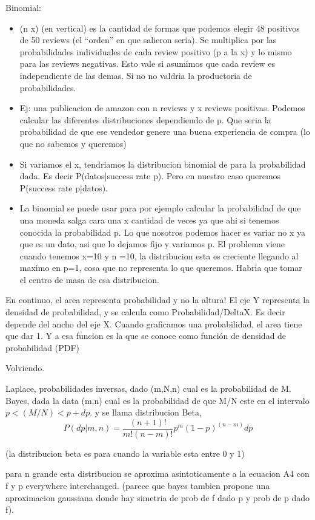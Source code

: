 \documentclass[20pt]{extarticle}
\begin{document}
Binomial:
\begin{itemize}
	\item (n x) (en vertical) es la cantidad de formas que podemos elegir 48 positivos de 50 reviews (el “orden” en que salieron seria). Se multiplica por las probabilidades individuales de cada review positivo (p a la x) y lo mismo para las reviews negativas. Esto vale si asumimos que cada review es independiente de las demas. Si no no valdria la productoria de probabilidades.
	\item Ej: una publicacion de amazon con n reviews y x reviews positivas. Podemos calcular las diferentes distribuciones dependiendo de p. Que seria la probabilidad de que ese vendedor genere una buena experiencia de compra (lo que no sabemos y queremos)
	\item Si variamos el x, tendriamos la distribucion binomial de para la probabilidad dada. Es decir P(datos|success rate p). Pero en nuestro caso queremos P(success rate p|datos).
	\item La binomial se puede usar para por ejemplo calcular la probabilidad de que una moneda salga cara una x cantidad de veces ya que ahi si tenemos conocida la probabilidad p.
Lo que nosotros podemos hacer es variar no x ya que es un dato, asi que lo dejamos fijo y variamos p.
El problema viene cuando tenemos x=10 y n =10, la distribucion esta es creciente llegando al maximo en p=1, cosa que no representa lo que queremos. Habria que tomar el centro de masa de esa distribucion.
\end{itemize}

En continuo, el area representa probabilidad y no la altura! El eje Y representa la densidad de probabilidad, y se calcula como Probabilidad/DeltaX. Es decir depende del ancho del eje X.
Cuando graficamos una probabilidad, el area tiene que dar 1. Y a esa funcion es la que se conoce como función de densidad de probabilidad (PDF)


Volviendo.

Laplace, probabilidades inversas, dado (m,N,n) cual es la probabilidad de M.
Bayes, dada la data (m,n) cual es la probabilidad de que M/N este en el intervalo $p< (M/N)<p+dp$. y se llama distribucion Beta,
\begin{equation}
	P(dp|m,n)= \frac{(n+1)!}{m!(n-m)!}p^m (1-p)^{(n-m)}dp
\end{equation}


(la distribucion beta es para cuando la variable esta entre 0  y 1)

para n grande  esta distribucion se aproxima asintoticamente a la ecuacion A4 con f y p everywhere interchanged.
(parece que bayes tambien propone una aproximacion gaussiana donde hay simetria de prob de f dado p y prob de p dado f).
\end{document}
